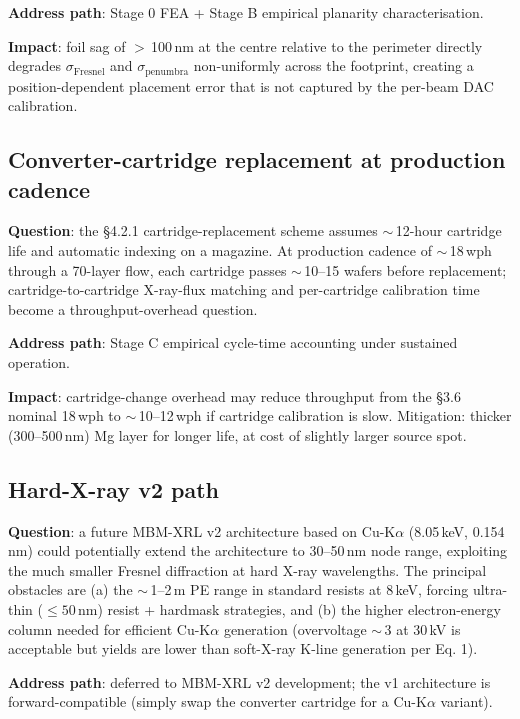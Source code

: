 \documentclass[11pt,letterpaper]{article}
\begin{document}
\textbf{Address path}: Stage 0 FEA + Stage B empirical planarity characterisation.

\textbf{Impact}: foil sag of $>$\,100\,nm at the centre relative to the perimeter directly degrades $\sigma_\text{Fresnel}$ and $\sigma_\text{penumbra}$ non-uniformly across the footprint, creating a position-dependent placement error that is not captured by the per-beam DAC calibration.

\subsection{Converter-cartridge replacement at production cadence}

\textbf{Question}: the \S 4.2.1 cartridge-replacement scheme assumes $\sim$\,12-hour cartridge life and automatic indexing on a magazine. At production cadence of $\sim$\,18\,wph through a 70-layer flow, each cartridge passes $\sim$\,10--15 wafers before replacement; cartridge-to-cartridge X-ray-flux matching and per-cartridge calibration time become a throughput-overhead question.

\textbf{Address path}: Stage C empirical cycle-time accounting under sustained operation.

\textbf{Impact}: cartridge-change overhead may reduce throughput from the \S 3.6 nominal 18\,wph to $\sim$\,10--12\,wph if cartridge calibration is slow. Mitigation: thicker (300--500\,nm) Mg layer for longer life, at cost of slightly larger source spot.

\subsection{Hard-X-ray v2 path}

\textbf{Question}: a future MBM-XRL v2 architecture based on Cu-K$\alpha$ (8.05\,keV, 0.154\,nm) could potentially extend the architecture to 30--50\,nm node range, exploiting the much smaller Fresnel diffraction at hard X-ray wavelengths. The principal obstacles are (a) the $\sim$\,1--2\,\textmu m PE range in standard resists at 8\,keV, forcing ultra-thin ($\leq 50$\,nm) resist + hardmask strategies, and (b) the higher electron-energy column needed for efficient Cu-K$\alpha$ generation (overvoltage $\sim$\,3 at 30\,kV is acceptable but yields are lower than soft-X-ray K-line generation per Eq. 1).

\textbf{Address path}: deferred to MBM-XRL v2 development; the v1 architecture is forward-compatible (simply swap the converter cartridge for a Cu-K$\alpha$ variant).
\end{document}
